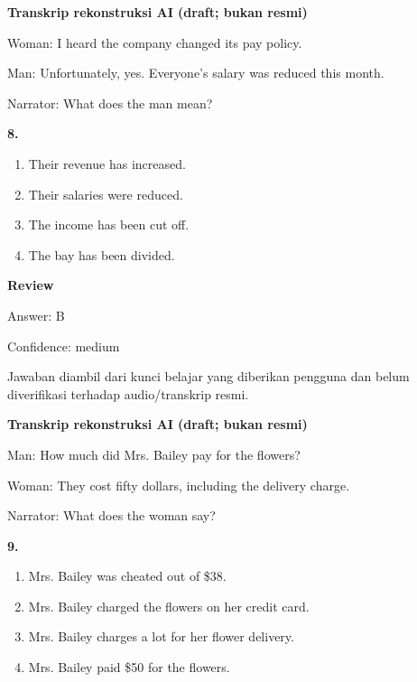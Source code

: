 \documentclass[12pt]{article}
\begin{document}
\begin{exampleblock}
\textbf{Transkrip rekonstruksi AI (draft; bukan resmi)}\par
Woman: I heard the company changed its pay policy.\par
Man: Unfortunately, yes. Everyone's salary was reduced this month.\par
Narrator: What does the man mean?\par
\end{exampleblock}
\noindent\textbf{8.}
\begin{enumerate}[label=(\Alph*),leftmargin=*,itemsep=0.2em]
\item Their revenue has increased.
\item Their salaries were reduced.
\item The income has been cut off.
\item The bay has been divided.
\end{enumerate}
\par
\begingroup
\setlength{\parskip}{0pt}
\setlength{\parindent}{0pt}
\textbf{Review}\par
Answer: B\par
Confidence: medium\par
Jawaban diambil dari kunci belajar yang diberikan pengguna dan belum diverifikasi terhadap audio/transkrip resmi.\par
\endgroup
\par
\vspace{0.25\baselineskip}
\begin{exampleblock}
\textbf{Transkrip rekonstruksi AI (draft; bukan resmi)}\par
Man: How much did Mrs. Bailey pay for the flowers?\par
Woman: They cost fifty dollars, including the delivery charge.\par
Narrator: What does the woman say?\par
\end{exampleblock}
\noindent\textbf{9.}
\begin{enumerate}[label=(\Alph*),leftmargin=*,itemsep=0.2em]
\item Mrs. Bailey was cheated out of \$38.
\item Mrs. Bailey charged the flowers on her credit card.
\item Mrs. Bailey charges a lot for her flower delivery.
\item Mrs. Bailey paid \$50 for the flowers.
\end{enumerate}
\par
\end{document}
